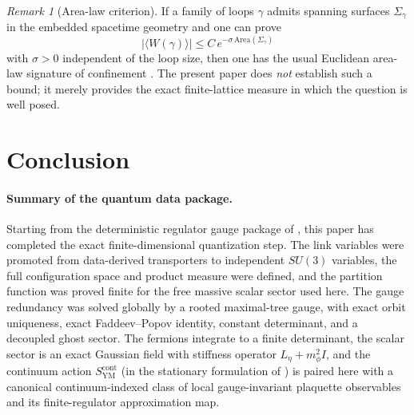 \documentclass[11pt]{article}
\theoremstyle{remark}
\newtheorem{remark}[theorem]{Remark}
\begin{document}
\begin{remark}[Area-law criterion]
\label{rem:area-law}
If a family of loops $\gamma$ admits spanning surfaces $\Sigma_\gamma$ in the
embedded spacetime geometry and one can prove
\[
|\langle W(\gamma)\rangle|
\le
C\,e^{-\sigma\,\mathrm{Area}(\Sigma_\gamma)}
\]
with $\sigma>0$ independent of the loop size, then one has the usual Euclidean
area-law signature of confinement \cite{wilson1974confinement}.  The present
paper does \emph{not} establish such a bound; it merely provides the exact
finite-lattice measure in which the question is well posed.
\end{remark}

\section{Conclusion}
\label{sec:conclusion}

\paragraph{Summary of the quantum data package.}
Starting from the deterministic regulator gauge package of \cite{continuumqft},
this paper has completed the exact finite-dimensional quantization step.  The
link variables were promoted from data-derived transporters to independent
$SU(3)$ variables, the full configuration space and product measure were
defined, and the partition function was proved finite for the free massive
scalar sector used here.  The gauge redundancy was solved globally by a rooted
maximal-tree gauge, with exact orbit uniqueness, exact Faddeev--Popov identity,
constant determinant, and a decoupled ghost sector.  The fermions integrate to
a finite determinant, the scalar sector is an exact Gaussian field with
stiffness operator $L_\eta+m_\phi^2I$, and the continuum action
$S_{\mathrm{YM}}^{\mathrm{cont}}$ (in the stationary formulation of
\cite{continuumqft}) is paired here with a canonical continuum-indexed class of
local gauge-invariant plaquette observables and its finite-regulator
approximation map.
\end{document}
